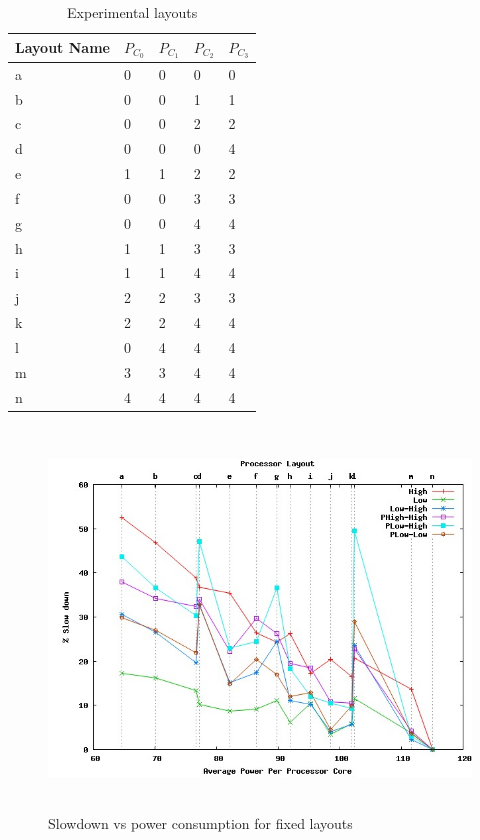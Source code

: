 \begin{table}[h!]
 \begin{center}
\begin{tabular}{| l | l | l | l | l | }
\hline	
Layout Name & $P_{C_{0}}$ & $P_{C_{1}}$ & $P_{C_{2}}$ & $P_{C_{3}}$ \\
\hline
a & 0 & 0 & 0 & 0 \\
b & 0 & 0 & 1 & 1 \\
c & 0 & 0 & 2 & 2 \\
d & 0 & 0 & 0 & 4 \\
e & 1 & 1 & 2 & 2 \\
f & 0 & 0 & 3 & 3 \\
g & 0 & 0 & 4 & 4 \\
h & 1 & 1 & 3 & 3 \\
i & 1 & 1 & 4 & 4 \\
j & 2 & 2 & 3 & 3 \\ 
k & 2 & 2 & 4 & 4 \\ 
l & 0 & 4 & 4 & 4 \\
m & 3 & 3 & 4 & 4 \\
n & 4 & 4 & 4 & 4 \\
\hline  
\end{tabular}
 \end{center}
\caption{Experimental layouts}
\label{tab:proc_layouts}
\end{table}

\begin{figure}[h!]
  \begin{center}
    \includegraphics[height=4in]{figures/fixed_results.jpg}%
    \caption{Slowdown vs power consumption for fixed layouts}
    \label{fig:fixed_res}
  \end{center}
\end{figure}

